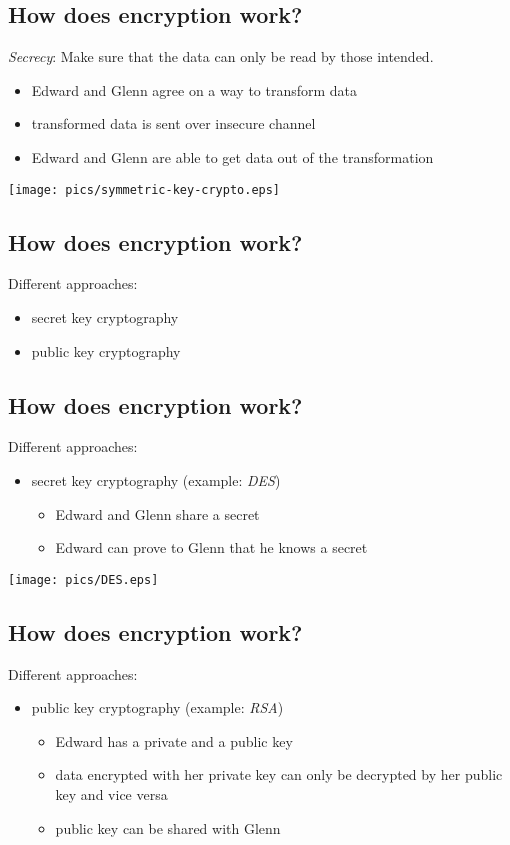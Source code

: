 \documentclass[xga]{xdvislides}
\begin{document}
\subsection{How does encryption work?}
{\em Secrecy}:  Make sure that the data can only be read by those intended.
\begin{itemize}
	\item {}Edward and Glenn agree on a way to transform data
	\item transformed data is sent over insecure channel
	\item Edward and Glenn are able to get data out of the transformation
\end{itemize}
\addvspace{.5in}
\begin{center}
	\texttt{[image: pics/symmetric-key-crypto.eps]}
\end{center}

\subsection{How does encryption work?}
Different approaches:
\begin{itemize}
	\item secret key cryptography
	\item public key cryptography
\end{itemize}

\subsection{How does encryption work?}
Different approaches:
\begin{itemize}
	\item secret key cryptography (example: {\em DES})
		\begin{itemize}
			\item Edward and Glenn share a secret
			\item Edward can prove to Glenn that he knows a secret
		\end{itemize}
\end{itemize}

 \begin{center}
        \texttt{[image: pics/DES.eps]}
 \end{center}

\subsection{How does encryption work?}
Different approaches:
\begin{itemize}
	\item public key cryptography (example: {\em RSA})
		\begin{itemize}
			\item Edward has a private and a public key
			\item data encrypted with her private key can only be decrypted by
				her public key and vice versa
			\item public key can be shared with Glenn
		\end{itemize}
\end{itemize}
\end{document}
